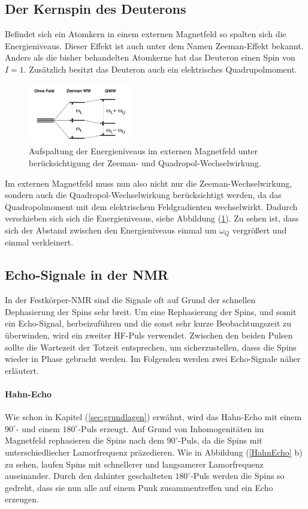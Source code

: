 \subsection{Der Kernspin des Deuterons}
Befindet sich ein Atomkern in einem externen Magnetfeld so spalten sich die Energie{\-}ni{\-}veaus.
Dieser Effekt ist auch unter dem Namen Zeeman-Effekt bekannt.
Anders als die bisher behandelten Atomkerne hat das Deuteron einen Spin von $I = 1$.
Zus\"{a}tzlich besitzt das Deuteron auch ein elektrisches Quadrupolmoment.
\begin{figure}[hbtp]
	\centering
	\includegraphics[width=0.4\textwidth]{Plots/aufspaltung.png}
	\caption{Aufspaltung der Energieniveaus im externen Magnetfeld unter ber\"{u}cksichtigung der Zeeman- und Quadropol-Wechselwirkung.}
	\label{QWW}
\end{figure}
Im externen Magnetfeld muss nun also nicht nur die Zeeman-Wechselwirkung, sondern auch die Quadropol-Wechselwirkung ber\"{u}cksichtigt werden, da das Quadropolmoment mit dem elektrischem Feldgradienten wechselwirkt.
Dadurch verschieben sich sich die Energieniveaus, siehe Abbildung (\ref{QWW}).
Zu sehen ist, dass sich der Abstand zwischen den Energieniveaus einmal um $\omega_Q$ vergr\"{o}{\ss}ert und einmal verkleinert.

\subsection{Echo-Signale in der NMR}
In der Festk\"{o}rper-NMR sind die Signale oft auf Grund der schnellen Dephasierung der Spins sehr breit.
Um eine Rephasierung der Spins, und somit ein Echo-Signal, herbeizuf\"{u}hren und die sonst sehr kurze Beobachtungszeit zu \"{u}berwinden, wird ein zweiter HF-Puls verwendet.
Zwischen den beiden Pulsen sollte die Wartezeit der Totzeit entsprechen, um sicherzustellen, dasss die Spins wieder in Phase gebracht werden.
Im Folgenden werden zwei %
Echo-Signale n\"{a}her erl\"{a}utert.

\paragraph{Hahn-Echo}
Wie schon in Kapitel (\ref{sec:grundlagen}) erw\"{a}hnt, wird das Hahn-Echo mit einem $90^{\circ}$- und einem $180^{\circ}$-Puls erzeugt.
Auf Grund von Inhomogenit\"{a}ten im Magnetfeld rephasieren die Spins nach dem $90^{\circ}$-Puls, da die Spins mit unterschiedliecher Lamorfrequenz pr\"{a}zedieren.
Wie in Abbildung (\ref{HahnEcho} b) zu sehen, laufen Spins mit schnellerer und langsamerer Lamor{\-}fre{\-}quenz auseinander.
Durch den dahinter geschalteten $180^{\circ}$-Puls werden die Spins so gedreht, dass sie nun alle auf einem Punk zusammentreffen und ein Echo erzeugen.


